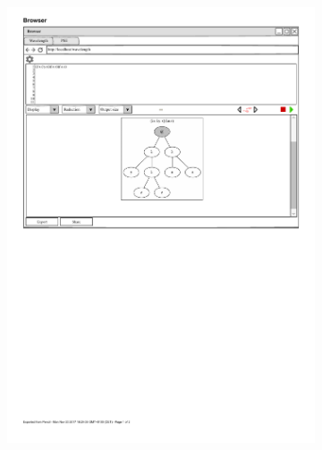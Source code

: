 \documentclass[parskip=full,11pt,twoside]{scrartcl}
\begin{document}
\begin{figure}[H]
	\begin{subfigure}{0.5\textwidth}
		\centering
		\includegraphics{img/displayTree4}
	\end{subfigure}
	\begin{subfigure}{0.5\textwidth}
		\centering

\end{subfigure}
\end{figure}
\end{document}
